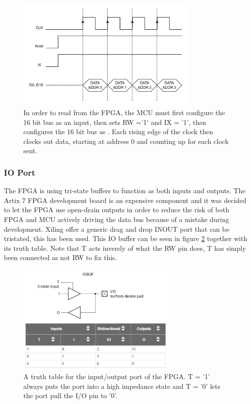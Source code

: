 \begin{figure}[H]
    \centering
    \includegraphics[clip, trim=0 0 0 0, width=0.8\textwidth]{Sections/7_SystemDesign/Figures/MCU_IX_FETCH.pdf}
    \caption{In order to read from the FPGA, the MCU must first configure the 16 bit bus as an input, then sets RW ='1' and IX = '1', then configures the 16 bit bus as . Each rising edge of the clock then clocks out data, starting at address 0 and counting up for each clock sent.}
    \label{fig_7_2_1_CommRead_IX}
\end{figure}

\subsubsection{IO Port}
The FPGA is using tri-state buffers to function as both inputs and outputs. The Artix 7 FPGA development board is an expensive component and it was decided to let the FPGA use open-drain outputs in order to reduce the risk of both FPGA and MCU actively driving the data bus because of a mistake during development. Xiling offer a generic drag and drop INOUT port that can be tristated, this has been used. This IO buffer can be seen in figure \ref{fig_7_2_1_IOBUF} together with its truth table. Note that T acts inversly of what the RW pin does, T has simply been connected as not RW to fix this.

\begin{figure}[H]
    \centering
    \includegraphics[clip, trim=0 0 0 0, width=0.7\textwidth]{Sections/7_SystemDesign/Figures/IOBUF.pdf}
    \caption{A truth table for the input/output port of the FPGA. T = '1' always puts the port into a high impedance state and T = '0' lets the port pull the I/O pin to '0'.}
    \label{fig_7_2_1_IOBUF}
\end{figure}

